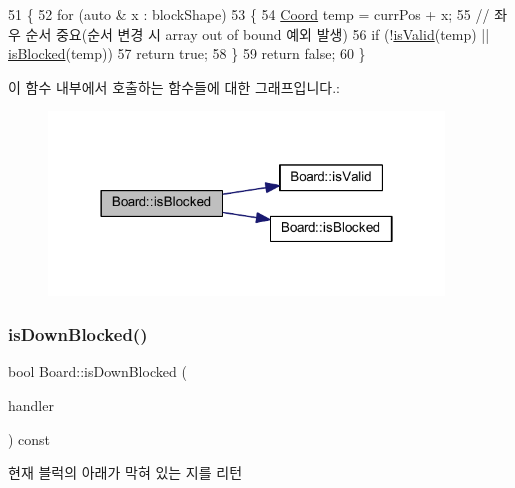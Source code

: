 \begin{DoxyCode}
51     \{
52         \textcolor{keywordflow}{for} (\textcolor{keyword}{auto} & x : blockShape)
53         \{
54             \mbox{\hyperlink{struct_coord}{Coord}} temp = currPos + x;
55             \textcolor{comment}{// 좌우 순서 중요(순서 변경 시 array out of bound 예외 발생)}
56             \textcolor{keywordflow}{if} (!\mbox{\hyperlink{class_board_a5df9c4c18c53b8029e0a080e5e089732}{isValid}}(temp) || \mbox{\hyperlink{class_board_a61ff9b1284e5c3e1214a780361ed650b}{isBlocked}}(temp))
57                 \textcolor{keywordflow}{return} \textcolor{keyword}{true};
58         \}
59         \textcolor{keywordflow}{return} \textcolor{keyword}{false};
60     \}
\end{DoxyCode}
이 함수 내부에서 호출하는 함수들에 대한 그래프입니다.\+:
\nopagebreak
\begin{figure}[H]
\begin{center}
\leavevmode
\includegraphics[width=298pt]{class_board_a1ba0d2a44e1469738220b5ff7dfda6fc_cgraph}
\end{center}
\end{figure}
\mbox{\label{class_board_ad617ae22e46d1a62ed33592b20e00b44}} 
\subsubsection{\texorpdfstring{is\+Down\+Blocked()}{isDownBlocked()}}
{\footnotesize\ttfamily bool Board\+::is\+Down\+Blocked (\begin{DoxyParamCaption}\item[{const \mbox{\hyperlink{class_block_handler}{Block\+Handler}} \&}]{handler }\end{DoxyParamCaption}) const\hspace{0.3cm}{\ttfamily [inline]}}



현재 블럭의 아래가 막혀 있는 지를 리턴 



